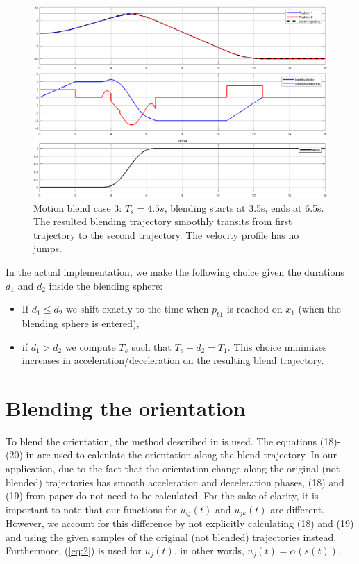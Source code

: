 \documentclass{amsart}
\theoremstyle{plain}
\numberwithin{equation}{section}
\begin{document}
\begin{enumerate}
	\begin{figure}%
	\includegraphics[width=\columnwidth]{figure/blend_case_3.eps}%
	\caption{Motion blend case 3: $T_s = 4.5s$, blending starts at 3.5s, ends at 6.5s. The resulted blending trajectory smoothly transits from first trajectory to the second trajectory. The velocity profile has no jumps.}%
	\label{blend_case_3}%
	\end{figure}

\end{enumerate}

In the actual implementation, we make the following choice given the durations $d_1$ and $d_2$ inside the blending sphere:
\begin{itemize}
\item If $d_1\leq d_2$ we shift exactly to the time when $p_{b1}$ is reached on $x_1$ (when the blending sphere is entered),
\item if $d_1>d_2$ we compute $T_s$ such that $T_s+d_2=T_1$. This choice minimizes increases in acceleration/deceleration on the resulting blend trajectory.
\end{itemize}


\section{Blending the orientation}
To blend the orientation, the method described in \cite{dantam2014orientation} is used. The equations (18)-(20) in \cite{dantam2014orientation} are used to calculate the orientation along the blend trajectory. In our application, due to the fact that the orientation change along the original (not blended) trajectories has smooth acceleration and deceleration phases, (18) and (19) from paper \cite{dantam2014orientation} do not need to be calculated.\newline
For the sake of clarity, it is important to note that our functions for $u_{ij}(t)$ and $u_{jk}(t)$ are different. However, we account for this difference by not explicitly calculating (18) and (19) and using the given samples of the original (not blended) trajectories instead. Furthermore,  (\ref{eq:2}) is used for $u_{j}(t)$, in other words, $u_{j}(t) = \alpha(s(t))$.
\end{document}
